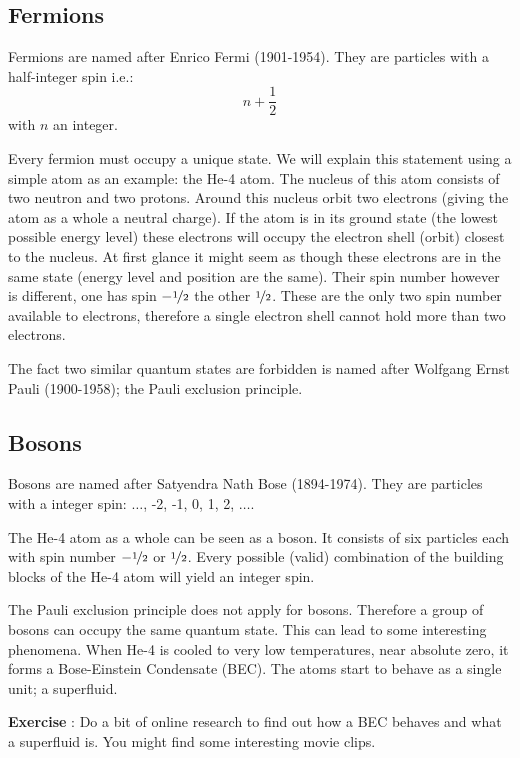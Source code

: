 \subsection{Fermions}
Fermions are named after Enrico Fermi (1901-1954). They are particles with a half-integer spin i.e.:
\begin{equation}
n + \frac{1}{2}
\end{equation}
with $n$ an integer.

Every fermion must occupy a unique state. We will explain this statement using a simple atom as an example: the He-4 atom. The nucleus of this atom consists of two neutron and two protons. Around this nucleus orbit two electrons (giving the atom as a whole a neutral charge). If the atom is in its ground state (the lowest possible energy level) these electrons will occupy the electron shell (orbit) closest to the nucleus. At first glance it might seem as though these electrons are in the same state (energy level and position are the same). Their spin number however is different, one has spin $-\nicefrac{1}{2}$ the other $\nicefrac{1}{2}$. These are the only two spin number available to electrons, therefore a single electron shell cannot hold more than two electrons.

The fact two similar quantum states are forbidden is named after Wolfgang Ernst Pauli (1900-1958); the Pauli exclusion principle.

\subsection{Bosons}
Bosons are named after Satyendra Nath Bose (1894-1974). They are particles with a integer spin: $\ldots$, -2, -1, 0, 1, 2, $\ldots$.

The He-4 atom as a whole can be seen as a boson. It consists of six particles each with spin number $-\nicefrac{1}{2}$ or $\nicefrac{1}{2}$. Every possible (valid) combination of the building blocks of the He-4 atom will yield an integer spin.

The Pauli exclusion principle does not apply for bosons. Therefore a group of bosons can occupy the same quantum state. This can lead to some interesting phenomena. When He-4 is cooled to very low temperatures, near absolute zero, it forms a Bose-Einstein Condensate (BEC). The atoms start to behave as a single unit; a superfluid.

\begin{shaded}
\textbf{Exercise \theExercise {}} : Do a bit of online research to find out how a BEC behaves and what a superfluid is. You might find some interesting movie clips.\end{shaded}

